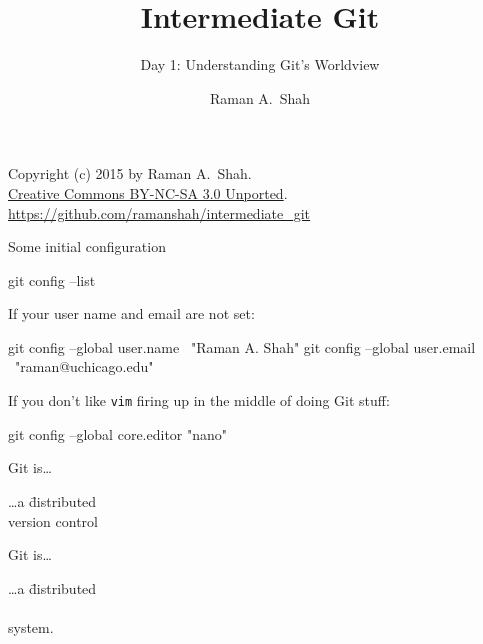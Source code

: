 

\title{Intermediate Git}
\subtitle{Day 1: Understanding Git's Worldview}
\author{Raman A.~Shah}
\date{}



\begin{frame}[plain]
  \titlepage
  \footnotesize{Copyright (c) 2015 by Raman A.~Shah.\\
  \href{https://creativecommons.org/licenses/by-nc-sa/3.0/legalcode}
       {Creative Commons BY-NC-SA 3.0 Unported}.\\
   \href{https://github.com/ramanshah/intermediate\_git}
        {https://github.com/ramanshah/intermediate\_git}}

\end{frame}

\begin{frame}[fragile]{Some initial configuration}
  \begin{gitCommand}git config --list\end{gitCommand}

  If your user name and email are not set:

  \begin{gitCommand}
git config --global user.name \
  "Raman A. Shah"
git config --global user.email \
  "raman@uchicago.edu"
  \end{gitCommand}

  If you don't like \texttt{vim} firing up in the middle of doing Git stuff:

  \begin{gitCommand}git config --global core.editor "nano"\end{gitCommand}

\end{frame}

\begin{frame}{Git is\ldots}
  \huge {
    \begin{tabbing}
      \ldots a \= distributed \\
      \> version control \\
      \> \color{ucMaroon}{system}\color{black}{.}
    \end{tabbing}
  }
\end{frame}

\begin{frame}{Git is\ldots}
  \huge {
    \begin{tabbing}
      \ldots a \= distributed \\
      \> \color{ucMaroon}{version control} \\
      \> system.
    \end{tabbing}
  }
\end{frame}

